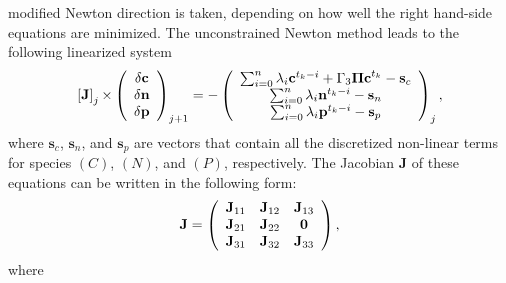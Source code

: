 \documentclass[aps,preprint]{revtex4}
\begin{document}
modified Newton direction is taken, depending on how well the right hand-side
equations are minimized. The unconstrained Newton method leads to the
following linearized system
\begin{equation}
\left[  \mathbf{J}\right]  _{j}\mathbf{\times}\left(
\begin{array}
[c]{c}
\delta\mathbf{c}\\
\delta\mathbf{n}\\
\delta\mathbf{p}
\end{array}
\right)  _{j+1}=-\left(
\begin{array}
[c]{c}
\sum_{i=0}^{n}\lambda_{i}\mathbf{c}^{t _{k}-i} + {\Gamma}_{3}\mathbf{\Pi c}^{t
_{k}} - \mathbf{s}_{c}\\
\sum_{i=0}^{n}\lambda_{i}\mathbf{n}^{t _{k}-i} - \mathbf{s}_{n}\\
\sum_{i=0}^{n}\lambda_{i}\mathbf{p}^{t _{k}-i} - \mathbf{s}_{p}
\end{array}
\right)  _{j},
\end{equation}
where $\mathbf{s}_{c}$, $\mathbf{s}_{n}$, and $\mathbf{s}_{p}$ are vectors
that contain all the discretized non-linear terms for species $(C)$, $(N)$,
and $(P)$, respectively. The Jacobian $\mathbf{J}$ of these equations can be
written in the following form:
\begin{equation}
\mathbf{J}=\left(
\begin{array}
[c]{ccc}
\mathbf{J}_{11} & \mathbf{J}_{12} & \mathbf{J}_{13}\\
\mathbf{J}_{21} & \mathbf{J}_{22} & \mathbf{0}\\
\mathbf{J}_{31} & \mathbf{J}_{32} & \mathbf{J}_{33}
\end{array}
\right)  ,
\end{equation}
where
\end{document}
